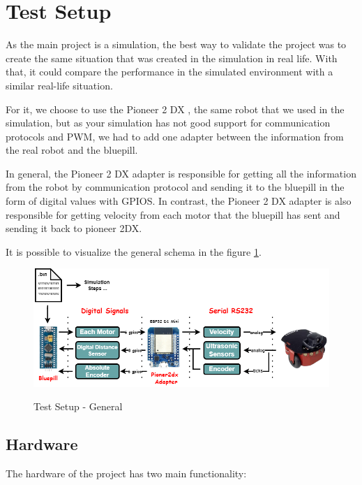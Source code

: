 \documentclass[../../monografia.tex]{subfiles}
\begin{document}
\section{Test Setup}
\label{section: Test Setup}

As the main project is a simulation, the best way to validate the project was to create the same situation that was created in the simulation in real life. With that, it could compare the performance in the simulated environment with a similar real-life situation.

For it, we choose to use the Pioneer 2 DX \cite{pioneer2dx_2024}, the same robot that we used in the simulation, but as your simulation has not good support for communication protocols and PWM, we had to add one adapter between the information from the real robot and the bluepill.

In general, the Pioneer 2 DX adapter is responsible for getting all the information from the robot by communication protocol and sending it to the bluepill in the form of digital values with GPIOS. In contrast, the Pioneer 2 DX adapter is also responsible for getting velocity from each motor that the bluepill has sent and sending it back to pioneer 2DX.

It is possible to visualize the general schema in the figure \ref{fig: Test Setup - General}.

\begin{figure}[h]
    \centering
    \caption{Test Setup - General}
    \centering %
    \includegraphics[width=16cm]{diagramas-test_setup-general.drawio.png}
    \label{fig: Test Setup - General}
\end{figure}

\subsection{Hardware}

The hardware of the project has two main functionality:
\end{document}
